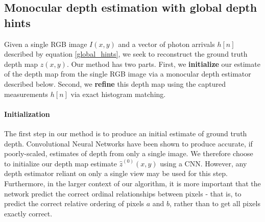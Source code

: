 \subsection{Monocular depth estimation with global depth hints}
Given a single RGB image $I(x,y)$ and a vector of photon arrivals $h[n]$
described by equation \ref{global_hints}, we seek to
reconstruct the ground truth depth map $z(x,y)$.
Our method has two parts. First, we \textbf{initialize} our estimate of the depth map from the single RGB
image via a monocular depth estimator described below. Second, we \textbf{refine} this depth map using
the captured measurements $h[n]$ via exact histogram matching. 

\paragraph{Initialization}
The first step in our method is to produce an initial estimate of ground truth
depth. Convolutional Neural Networks have been shown to produce accurate, if poorly-scaled, estimates of depth
from only a single image. We therefore choose to initialize our depth map
estimate $\hat z^{(0)}(x,y)$ using
a CNN. However, any depth estimator reliant on only a single
view may be used for this step. Furthermore, in the larger context of our
algorithm, it is more important that the network predict the correct ordinal
relationships between pixels - that is, to predict the correct relative ordering
of pixels $a$ and $b$, rather than to get all pixels exactly correct.

